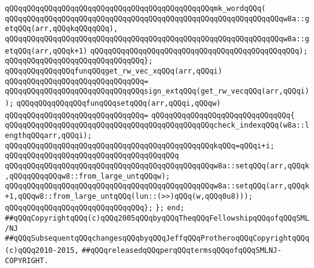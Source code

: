 \verb|qQQqqQQqqQQqqQQqqQQqqQQqqQQqqQQqqQQqqQQqqQQqqQQqmk_wordqQQq(|\newline
\verb|qQQqqQQqqQQqqQQqqQQqqQQqqQQqqQQqqQQqqQQqqQQqqQQqqQQqqQQqqQQqqQQqw8a::getqQQq(arr,qQQqkqQQqqQQq),|\newline
\verb|qQQqqQQqqQQqqQQqqQQqqQQqqQQqqQQqqQQqqQQqqQQqqQQqqQQqqQQqqQQqqQQqw8a::getqQQq(arr,qQQqk+1)|\newline
\verb|qQQqqQQqqQQqqQQqqQQqqQQqqQQqqQQqqQQqqQQqqQQqqQQq);|\newline
\verb|qQQqqQQqqQQqqQQqqQQqqQQqqQQqqQQq};|\newline
\newline
\verb|qQQqqQQqqQQqqQQqfunqQQqget_rw_vec_xqQQq(arr,qQQqi)|\newline
\verb|qQQqqQQqqQQqqQQqqQQqqQQqqQQqqQQq=|\newline
\verb|qQQqqQQqqQQqqQQqqQQqqQQqqQQqqQQqsign_extqQQq(get_rw_vecqQQq(arr,qQQqi));|\newline
\newline
\verb|qQQqqQQqqQQqqQQqfunqQQqsetqQQq(arr,qQQqi,qQQqw)|\newline
\verb|qQQqqQQqqQQqqQQqqQQqqQQqqQQqqQQq=|\newline
\verb|qQQqqQQqqQQqqQQqqQQqqQQqqQQqqQQq{|\newline
\verb|qQQqqQQqqQQqqQQqqQQqqQQqqQQqqQQqqQQqqQQqqQQqqQQqcheck_indexqQQq(w8a::lengthqQQqarr,qQQqi);|\newline
\verb|qQQqqQQqqQQqqQQqqQQqqQQqqQQqqQQqqQQqqQQqqQQqqQQqkqQQq=qQQqi+i;|\newline
\verb|qQQqqQQqqQQqqQQqqQQqqQQqqQQqqQQqqQQqqQQq|\newline
\verb|qQQqqQQqqQQqqQQqqQQqqQQqqQQqqQQqqQQqqQQqqQQqqQQqw8a::setqQQq(arr,qQQqk,qQQqqQQqqQQqw8::from_large_untqQQqw);|\newline
\verb|qQQqqQQqqQQqqQQqqQQqqQQqqQQqqQQqqQQqqQQqqQQqqQQqw8a::setqQQq(arr,qQQqk+1,qQQqw8::from_large_untqQQq(lun::(>>)qQQq(w,qQQq0u8)));|\newline
\verb|qQQqqQQqqQQqqQQqqQQqqQQqqQQqqQQq};|\newline
\newline
\verb|};|\newline
\verb|end;|\newline
\newline
\newline
\newline
\verb|##qQQqCopyrightqQQq(c)qQQq2005qQQqbyqQQqTheqQQqFellowshipqQQqofqQQqSML/NJ|\newline
\verb|##qQQqSubsequentqQQqchangesqQQqbyqQQqJeffqQQqProtheroqQQqCopyrightqQQq(c)qQQq2010-2015,|\newline
\verb|##qQQqreleasedqQQqperqQQqtermsqQQqofqQQqSMLNJ-COPYRIGHT.|\newline

